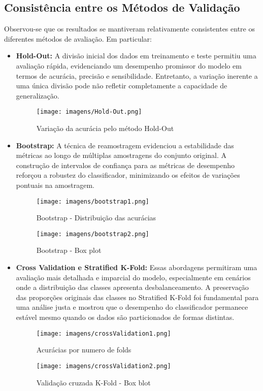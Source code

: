 \documentclass[conference]{IEEEtran}
\begin{document}
\subsection{Consistência entre os Métodos de Validação}
Observou-se que os resultados se mantiveram relativamente consistentes entre os diferentes métodos de avaliação. Em particular:
\begin{itemize}
    \item \textbf{Hold-Out:} A divisão inicial dos dados em treinamento e teste permitiu uma avaliação rápida, evidenciando um desempenho promissor do modelo em termos de acurácia, precisão e sensibilidade. Entretanto, a variação inerente a uma única divisão pode não refletir completamente a capacidade de generalização.
    \begin{figure}[htbp]
        \centering
        \texttt{[image: imagens/Hold-Out.png]}
        \caption{Variação da acurácia pelo método Hold-Out}
        \label{hold_out}
    \end{figure}
    
    \item \textbf{Bootstrap:} A técnica de reamostragem evidenciou a estabilidade das métricas ao longo de múltiplas amostragens do conjunto original. A construção de intervalos de confiança para as métricas de desempenho reforçou a robustez do classificador, minimizando os efeitos de variações pontuais na amostragem.
    \begin{figure}[htbp]
        \centering
        \texttt{[image: imagens/bootstrap1.png]}
        \caption{Bootstrap - Distribuição das acurácias}
        \label{bootstrap_amostras}
    \end{figure}
    \begin{figure}[htbp]
        \centering
        \texttt{[image: imagens/bootstrap2.png]}
        \caption{Bootstrap - Box plot}
        \label{bootstrap_distribuicao}
    \end{figure}
    
    \item \textbf{Cross Validation e Stratified K-Fold:} Essas abordagens permitiram uma avaliação mais detalhada e imparcial do modelo, especialmente em cenários onde a distribuição das classes apresenta desbalanceamento. A preservação das proporções originais das classes no Stratified K-Fold foi fundamental para uma análise justa e mostrou que o desempenho do classificador permanece estável mesmo quando os dados são particionados de formas distintas.
    \begin{figure}[htbp]
        \centering
        \texttt{[image: imagens/crossValidation1.png]}
        \caption{Acurácias por numero de folds}
        \label{cross_val_etapas}
    \end{figure}
    \begin{figure}[htbp]
        \centering
        \texttt{[image: imagens/crossValidation2.png]}
        \caption{Validação cruzada K-Fold - Box blot}
        \label{cross_val_resultados}
    \end{figure}
\end{itemize}
\end{document}
